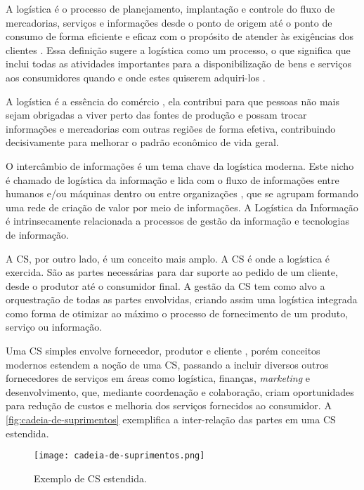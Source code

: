 A logística é o processo de planejamento, implantação e controle do fluxo de mercadorias, serviços e informações desde o ponto de origem até o ponto de consumo de forma eficiente e eficaz com o propósito de atender às exigências dos clientes \cite{cscmp2013supplychainglossary}. Essa definição sugere a logística como um processo, o que significa que inclui todas as atividades importantes para a disponibilização de bens e serviços aos consumidores quando e onde estes quiserem adquiri-los \cite{ballou2006cadeiasuprimentos}.

A logística é a essência do comércio \cite{ballou2006cadeiasuprimentos}, ela contribui para que pessoas não mais sejam obrigadas a viver perto das fontes de produção e possam trocar informações e mercadorias com outras regiões de forma efetiva, contribuindo decisivamente para melhorar o padrão econômico de vida geral.

O intercâmbio de informações é um tema chave da logística moderna. Este nicho é chamado de logística da informação e lida com o fluxo de informações entre humanos e/ou máquinas dentro ou entre organizações \cite{haftor2011information}, que se agrupam formando uma rede de criação de valor por meio de informações. A Logística da Informação é intrinsecamente relacionada a processos de gestão da informação e tecnologias de informação.

A CS, por outro lado, é um conceito mais amplo. A CS é onde a logística é exercida. São as partes necessárias para dar suporte ao pedido de um cliente, desde o produtor até o consumidor final. A gestão da CS tem como alvo a orquestração de todas as partes envolvidas, criando assim uma logística integrada como forma de otimizar ao máximo o processo de fornecimento de um produto, serviço ou informação.

Uma CS simples envolve fornecedor, produtor e cliente \cite{hugos2018supplychain}, porém conceitos modernos estendem a noção de uma CS, passando a incluir diversos outros fornecedores de serviços em áreas como logística, finanças, \textit{marketing} e desenvolvimento, que, mediante coordenação e colaboração, criam oportunidades para redução de custos e melhoria dos serviços fornecidos ao consumidor. A \autoref{fig:cadeia-de-suprimentos} exemplifica a inter-relação das partes em uma CS estendida.

\begin{figure}[htb]
	\centering
	\texttt{[image: cadeia-de-suprimentos.png]}
	\caption{Exemplo de CS estendida.}
	\label{fig:cadeia-de-suprimentos}
\end{figure}

